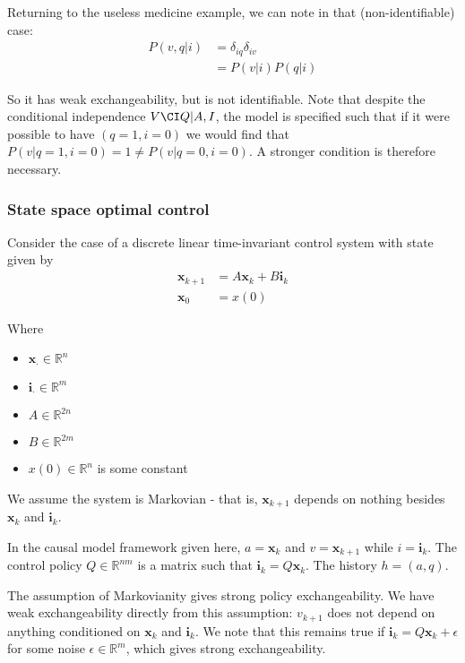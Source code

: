 Returning to the useless medicine example, we can note in that (non-identifiable) case:
\begin{align}
P(v,q|i) &= \delta_{iq} \delta_{iv}\\
         &= P(v|i) P(q|i)
\end{align}

So it has weak exchangeability, but is not identifiable. Note that despite the conditional independence $V\CI Q | A, I$, the model is specified such that if it were possible to have $(q=1,i=0)$ we would find that $P(v|q=1,i=0) = 1 \neq P(v|q=0,i=0)$. A stronger condition is therefore necessary.

\subsubsection{State space optimal control}

Consider the case of a discrete linear time-invariant control system with state given by
\begin{align}
    \mathbf{x}_{k+1} &= A\mathbf{x}_k + B\mathbf{i}_k\\
    \mathbf{x}_0 &= x(0)
\end{align}

Where 
\begin{itemize}
    \item $\mathbf{x}_\cdot \in \mathbb{R}^n$
    \item $\mathbf{i}_\cdot \in \mathbb{R}^m$
    \item $A\in \mathbb{R}^{2n}$
    \item $B\in \mathbb{R}^{2m}$
    \item $x(0)\in \mathbb{R}^n$ is some constant
\end{itemize}

We assume the system is Markovian - that is, $\mathbf{x}_{k+1}$ depends on nothing besides $\mathbf{x}_k$ and $\mathbf{i}_k$. 

In the causal model framework given here, $a=\mathbf{x}_k$ and $v=\mathbf{x}_{k+1}$ while $i=\mathbf{i}_k$. The control policy $Q\in \mathbb{R}^{nm}$ is a matrix such that $\mathbf{i}_k = Q\mathbf{x}_k$. The history $h=(a,q)$.

The assumption of Markovianity gives strong policy exchangeability. We have weak exchangeability directly from this assumption: $v_{k+1}$ does not depend on anything conditioned on $\mathbf{x}_k$ and $\mathbf{i}_k$. We note that this remains true if $\mathbf{i}_k = Q\mathbf{x}_k + \epsilon$ for some noise $\epsilon \in \mathbb{R}^m$, which gives strong exchangeability.

